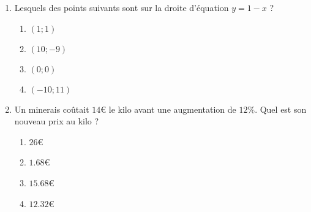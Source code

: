 
\begin{exercice}\label{exosmath-0438}

    \begin{multicols}{2}
        \begin{enumerate}
            \item
                Lesquels des points suivants sont sur la droite d'équation \( y=1-x\) ?
                \begin{enumerate}
                    \item
                        \( (1;1)\)
                    \item
                        \( (10;-9)\)
                    \item
                        \( (0;0)\)
                    \item
                        \( (-10;11)\)
                \end{enumerate}
                \columnbreak
            \item
                Un minerais coûtait \( 14\)€ le kilo avant une augmentation de \( 12\%\). Quel est son nouveau prix au kilo ?
                \begin{enumerate}
                    \item
                        \( 26\)€
                    \item
                        \( 1.68\)€
                    \item
                        \( 15.68\)€
                    \item
                        \( 12.32\)€
                \end{enumerate}
        \end{enumerate}
    \end{multicols}

\end{exercice}
